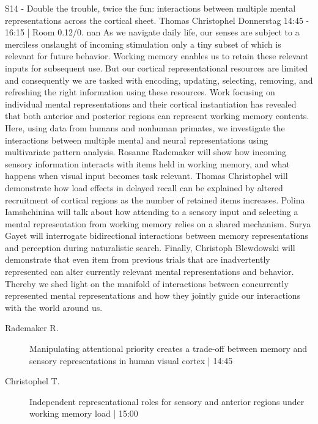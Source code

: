 
            \begin{symposium}
            {S14 - Double the trouble, twice the fun: interactions between multiple mental representations across the cortical sheet.}
            {Thomas Christophel}
            {Donnerstag 14:45 - 16:15 | Room 0.12/0.}
            {nan}
            As we navigate daily life, our senses are subject to a merciless onslaught of incoming stimulation only a tiny subset of which is relevant for future behavior. Working memory enables us to retain these relevant inputs for subsequent use. But our cortical representational resources are limited and consequently we are tasked with encoding, updating, selecting, removing, and refreshing the right information using these resources. Work focusing on individual mental representations and their cortical instantiation has revealed that both anterior and posterior regions can represent working memory contents. Here, using data from humans and nonhuman primates, we investigate the interactions between multiple mental and neural representations using multivariate pattern analysis. Rosanne Rademaker will show how incoming sensory information interacts with items held in working memory, and what happens when visual input becomes task relevant. Thomas Christophel will demonstrate how load effects in delayed recall can be explained by altered recruitment of cortical regions as the number of retained items increases. Polina Iamshchinina will talk about how attending to a sensory input and selecting a mental representation from working memory relies on a shared mechanism. Surya Gayet will interrogate bidirectional interactions between memory representations and perception during naturalistic search. Finally, Christoph Blewdowski will demonstrate that even item from previous trials that are inadvertently represented can alter currently relevant mental representations and behavior. Thereby we shed light on the manifold of interactions between concurrently represented mental representations and how they jointly guide our interactions with the world around us.
            \begin{description}    
            
                \item [ Rademaker R.] Manipulating attentional priority creates a trade-off between memory and sensory representations in human visual cortex  \textcolor{mygray}{ | 14:45}    
                
                \item [ Christophel T.] Independent representational roles for sensory and anterior regions under working memory load  \textcolor{mygray}{ | 15:00}    
                

\end{description}
\end{symposium}
